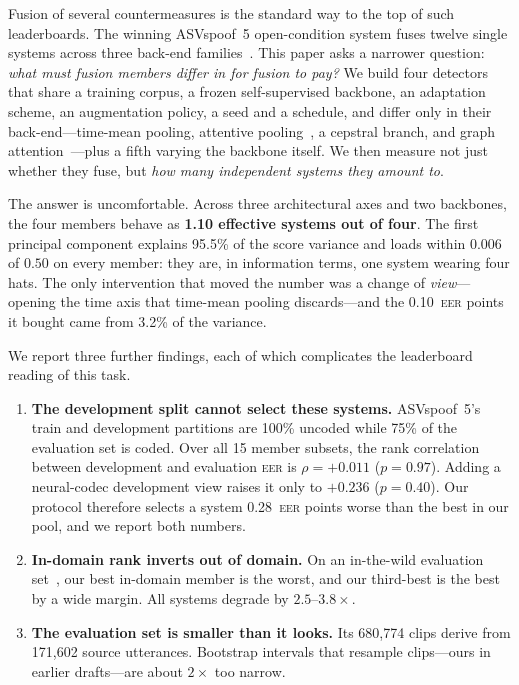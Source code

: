 \documentclass{llncs}
\newcommand{\eer}{\textsc{eer}}
\begin{document}
Fusion of several countermeasures is the standard way to the top of such
leaderboards.  The winning ASVspoof~5 open-condition system fuses twelve single
systems across three back-end families~\cite{ustc2024}.  This paper asks a
narrower question: \emph{what must fusion members differ in for fusion to pay?}
We build four detectors that share a training corpus, a frozen self-supervised
backbone, an adaptation scheme, an augmentation policy, a seed and a schedule,
and differ only in their back-end---time-mean pooling, attentive
pooling~\cite{attentive_pool}, a cepstral branch, and graph
attention~\cite{gat_spoof}---plus a fifth varying the backbone itself.  We then
measure not just whether they fuse, but \emph{how many independent systems they
amount to}.

The answer is uncomfortable.  Across three architectural axes and two backbones,
the four members behave as \textbf{1.10 effective systems out of four}.  The first
principal component explains 95.5\% of the score variance and loads within 0.006 of
$0.50$ on every member: they are, in information terms, one system wearing four
hats.  The only intervention that moved the number was a change of
\emph{view}---opening the time axis that time-mean pooling discards---and the
0.10~\eer{} points it bought came from 3.2\% of the variance.

We report three further findings, each of which complicates the leaderboard
reading of this task.

\begin{enumerate}\itemsep2pt
\item \textbf{The development split cannot select these systems.}
  ASVspoof~5's train and development partitions are 100\% uncoded while 75\% of
  the evaluation set is coded.  Over all 15 member subsets, the rank correlation
  between development and evaluation \eer{} is $\rho{=}+0.011$ ($p{=}0.97$).
  Adding a neural-codec development view raises it only to $+0.236$ ($p{=}0.40$).
  Our protocol therefore selects a system 0.28~\eer{} points worse than the best
  in our pool, and we report both numbers.

\item \textbf{In-domain rank inverts out of domain.}
  On an in-the-wild evaluation set~\cite{intothewild}, our best in-domain member
  is the worst, and our third-best is the best by a wide margin.  All systems
  degrade by $2.5$--$3.8\times$.

\item \textbf{The evaluation set is smaller than it looks.}
  Its 680{,}774 clips derive from 171{,}602 source utterances.  Bootstrap
  intervals that resample clips---ours in earlier drafts---are about $2\times$
  too narrow.
\end{enumerate}
\end{document}
